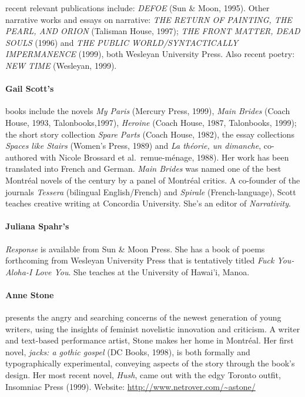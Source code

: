 \documentclass[
]{memoir}
\begin{document}
recent relevant publications include: \emph{DEFOE} (Sun \& Moon, 1995).
Other narrative works and essays on narrative: \emph{THE RETURN OF
PAINTING, THE PEARL, AND ORION} (Talisman House, 1997); \emph{THE FRONT
MATTER, DEAD SOULS} (1996) and \emph{THE PUBLIC WORLD/SYNTACTICALLY
IMPERMANENCE} (1999), both Wesleyan University Press. Also recent
poetry: \emph{NEW TIME} (Wesleyan, 1999).

\hypertarget{gail-scotts}{%
\paragraph{Gail Scott's}\label{gail-scotts}}

books include the novels \emph{My Paris} (Mercury Press, 1999),
\emph{Main Brides} (Coach House, 1993, Talonbooks,1997), \emph{Heroine}
(Coach House, 1987, Talonbooks, 1999); the short story collection
\emph{Spare Parts} (Coach House, 1982), the essay collections
\emph{Spaces like Stairs} (Women's Press, 1989) and \emph{La théorie, un
dimanche}, co-authored with Nicole Brossard et al.~remue-ménage, 1988).
Her work has been translated into French and German. \emph{Main Brides}
was named one of the best Montréal novels of the century by a panel of
Montréal critics. A co-founder of the journals \emph{Tessera} (bilingual
English/French) and \emph{Spirale} (French-language), Scott teaches
creative writing at Concordia University. She's an editor of
\emph{Narrativity}.

\hypertarget{juliana-spahrs}{%
\paragraph{Juliana Spahr's}\label{juliana-spahrs}}

\emph{Response} is available from Sun \& Moon Press. She has a book of
poems forthcoming from Wesleyan University Press that is tentatively
titled \emph{Fuck You-Aloha-I Love You}. She teaches at the University
of Hawai'i, Manoa.

\hypertarget{anne-stone}{%
\paragraph{Anne Stone}\label{anne-stone}}

presents the angry and searching concerns of the newest generation of
young writers, using the insights of feminist novelistic innovation and
criticism. A writer and text-based performance artist, Stone makes her
home in Montréal. Her first novel, \emph{jacks: a gothic gospel} (DC
Books, 1998), is both formally and typographically experimental,
conveying aspects of the story through the book's design. Her most
recent novel, \emph{Hush}, came out with the edgy Toronto outfit,
Insomniac Press (1999). Website:
\href{http://www.netrover.com/\%7Eastone}{http://www.netrover.com/\textasciitilde{}astone/}
\end{document}

